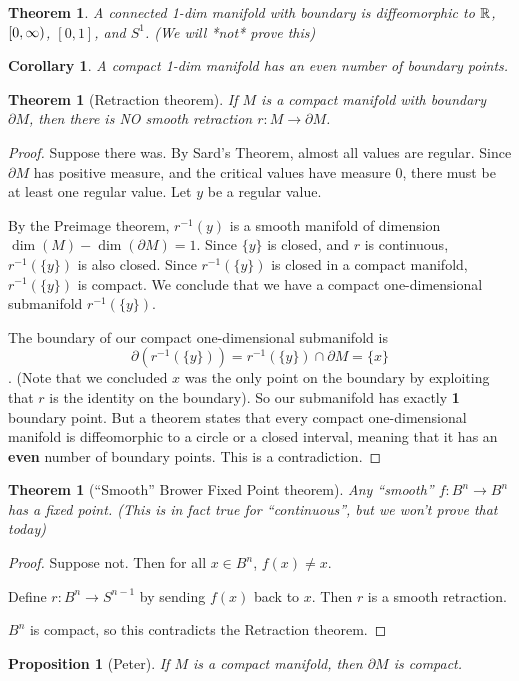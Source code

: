 \documentclass[11pt]{amsbook}
\theoremstyle{mystyle} \newtheorem{thrm}[thm]{Theorem}
\theoremstyle{mystyle} \newtheorem{defi}[thm]{Definition}
\theoremstyle{mystyle} \newtheorem{coro}[thm]{Corollary}
\theoremstyle{mystyle} \newtheorem{propo}[thm]{Proposition}
\theoremstyle{mystyle} \newtheorem{lemm}[thm]{Lemma}
\numberwithin{thm}{section}
\renewcommand{\d}{\partial}
\begin{document}
\begin{thrm}
	A connected 1-dim manifold with boundary is diffeomorphic to ${\mathbb R}$, $[0,\infty)$, $[0,1]$, and $S^1$.  (We will *not* prove this)
\end{thrm}
\begin{coro}
	A compact 1-dim manifold has an even number of boundary points.
\end{coro}
\begin{thrm}[Retraction theorem]
	If $M$ is a compact manifold with boundary $\d M$, then there is NO smooth retraction $r : M \to \d M$.
\end{thrm}
\begin{proof}
	Suppose there was.  By Sard's Theorem, almost all values are regular.  Since $\d M$ has positive measure, and the critical values have measure 0, there must be at least one regular value.  Let $y$ be a regular value.

	By the Preimage theorem, $r^{-1}(y)$ is a smooth manifold of dimension $\dim(M) - \dim(\d M) = 1$.  Since $\{y\}$ is closed, and $r$ is continuous, $r^{-1}(\{y\})$ is also closed.  Since $r^{-1}(\{y\})$ is closed in a compact manifold, $r^{-1}(\{y\})$ is compact.  We conclude that we have a compact one-dimensional submanifold $r^{-1}(\{y\})$.

	The boundary of our compact one-dimensional submanifold is $$\d (r ^{-1}(\{y\})) = r^{-1}(\{y\}) \cap \d M = \{x\}$$.  (Note that we concluded $x$ was the only point on the boundary by exploiting that $r$ is the identity on the boundary).   So our submanifold has exactly \textbf{1} boundary point.  But a theorem states that every compact one-dimensional manifold is diffeomorphic to a circle or a closed interval, meaning that it has an \textbf{even} number of boundary points.  This is a contradiction.
\end{proof}
\begin{thrm}[``Smooth'' Brower Fixed Point theorem]
	Any ``smooth'' $f : B^n \to B^n$ has a fixed point.  (This is in fact true for ``continuous'', but we won't prove that today)
\end{thrm}
\begin{proof}
	Suppose not.  Then for all $x \in B^n$, $f(x) \not= x$.

	Define $r : B^n \to S^{n-1}$ by sending $f(x)$ back to $x$.  Then $r$ is a smooth retraction.

	$B^n$ is compact, so this contradicts the Retraction theorem.
\end{proof}
\begin{propo}[Peter]
	If $M$ is a compact manifold, then $\d M$ is compact.
\end{propo}
\end{document}
